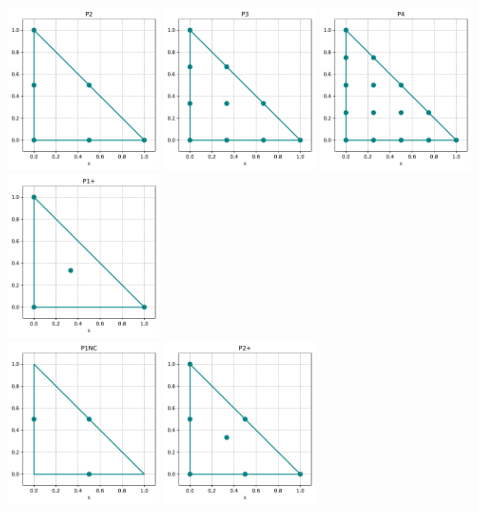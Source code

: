 \begin{center}
\includegraphics[width=4cm]{python_codes/fieldstone_120/spaces/P2_nodes}
\includegraphics[width=4cm]{python_codes/fieldstone_120/spaces/P3_nodes}
\includegraphics[width=4cm]{python_codes/fieldstone_120/spaces/P4_nodes}
\includegraphics[width=4cm]{python_codes/fieldstone_120/spaces/P1+_nodes}\\
\includegraphics[width=4cm]{python_codes/fieldstone_120/spaces/P1NC_nodes}
\includegraphics[width=4cm]{python_codes/fieldstone_120/spaces/P2+_nodes}
\end{center}

